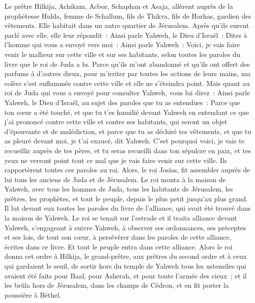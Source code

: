 \begin{multicols}{2}
Le prêtre Hilkija, Achikam, Acbor, Schaphan et Asaja, allèrent auprès de la prophétesse Hulda, femme de Schallum, fils de Thikva, fils de Harhas, gardien des vêtements. Elle habitait dans un autre quartier de Jérusalem.
Après qu'ils eurent parlé avec elle, elle leur répondit~: Ainsi parle Yahweh, le Dieu d'Israël~: Dites à l'homme qui vous a envoyé vers moi~:
Ainsi parle Yahweh~: Voici, je vais faire venir le malheur sur cette ville et sur ses habitants, selon toutes les paroles du livre que le roi de Juda a lu.
Parce qu'ils m'ont abandonné et qu'ils ont offert des parfums à d'autres dieux, pour m'irriter par toutes les actions de leurs mains, ma colère s'est enflammée contre cette ville et elle ne s'éteindra point.
Mais quant au roi de Juda qui vous a envoyé pour consulter Yahweh, vous lui direz~: Ainsi parle Yahweh, le Dieu d'Israël, au sujet des paroles que tu as entendues~:
Parce que ton cœur a été touché, et que tu t'es humilié devant Yahweh en entendant ce que j'ai prononcé contre cette ville et contre ses habitants, qui seront un objet d'épouvante et de malédiction, et parce que tu as déchiré tes vêtements, et que tu as pleuré devant moi, je t'ai exaucé, dit Yahweh.
C'est pourquoi voici, je vais te recueillir auprès de tes pères, et tu seras recueilli dans ton sépulcre en paix, et tes yeux ne verront point tout ce mal que je vais faire venir sur cette ville. Ils rapportèrent toutes ces paroles au roi.
\VerseOne{}Alors, le roi Josias, fit assembler auprès de lui tous les anciens de Juda et de Jérusalem.
Le roi monta à la maison de Yahweh, avec tous les hommes de Juda, tous les habitants de Jérusalem, les prêtres, les prophètes, et tout le peuple, depuis le plus petit jusqu'au plus grand. Il lut devant eux toutes les paroles du livre de l'alliance, qui avait été trouvé dans la maison de Yahweh.
Le roi se tenait sur l'estrade et il traita alliance devant Yahweh, s'engageant à suivre Yahweh, à observer ses ordonnances, ses préceptes et ses lois, de tout son cœur, à persévérer dans les paroles de cette alliance, écrites dans ce livre. Et tout le peuple entra dans cette alliance.
Alors le roi donna cet ordre à Hilkija, le grand-prêtre, aux prêtres du second ordre et à ceux qui gardaient le seuil, de sortir hors du temple de Yahweh tous les ustensiles qui avaient été faits pour Baal, pour Asherah, et pour toute l'armée des cieux~; et il les brûla hors de Jérusalem, dans les champs de Cédron, et en fit porter la poussière à Béthel.

\end{multicols}

